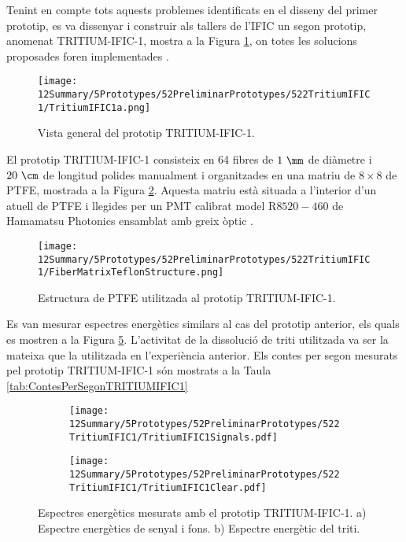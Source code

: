 Tenint en compte tots aquests problemes identificats en el disseny del primer prototip, es va dissenyar i construir als tallers de l'IFIC un segon prototip, anomenat TRITIUM-IFIC-1, mostra a la Figura \ref{fig:TritumIFIC1s}, on totes les solucions proposades foren implementades .

\begin{figure}[h]
\centering
\texttt{[image: 12Summary/5Prototypes/52PreliminarPrototypes/522TritiumIFIC1/TritiumIFIC1a.png]}
\caption{Vista general del prototip TRITIUM-IFIC-1.\label{fig:TritumIFIC1s}}
\end{figure}

El prototip TRITIUM-IFIC-1 consisteix en 64 fibres de $1~\mm$ de diàmetre i $20~\cm$ de longitud polides manualment i organitzades en una matriu de $8\times 8$ de PTFE, mostrada a la Figura \ref{fig:EstructuraPTFEFibresTritiumIFIC1}. Aquesta matriu està situada a l'interior d'un atuell de PTFE i llegides per un PMT calibrat model R$8520-460$ de Hamamatsu Photonics \cite{DataSheetPMTs} ensamblat amb greix òptic \cite{OpticalGrease}.

\begin{figure}[h]
\centering
\texttt{[image: 12Summary/5Prototypes/52PreliminarPrototypes/522TritiumIFIC1/FiberMatrixTeflonStructure.png]}
\caption{Estructura de PTFE utilitzada al prototip TRITIUM-IFIC-1.\label{fig:EstructuraPTFEFibresTritiumIFIC1}}
\end{figure}

Es van mesurar espectres energètics similars al cas del prototip anterior, els quals es mostren a la Figura \ref{fig:EspectresEnergeticsTRITIUMIFIC1}. L'activitat de la dissolució de triti utilitzada va ser la mateixa que la utilitzada en l'experiència anterior. Els contes per segon mesurats pel prototip TRITIUM-IFIC-1 són mostrats a la Taula \ref{tab:ContesPerSegonTRITIUMIFIC1}

\begin{figure}
\centering
    \begin{subfigure}[b]{1\textwidth}
    \centering
    \texttt{[image: 12Summary/5Prototypes/52PreliminarPrototypes/522TritiumIFIC1/TritiumIFIC1Signals.pdf]}  
    \caption{\label{subfig:EspectreEnergeticSenyalFonsTritiumIFIC1}}
    \end{subfigure}
    \hfill
    \begin{subfigure}[b]{1\textwidth}
    \centering
    \texttt{[image: 12Summary/5Prototypes/52PreliminarPrototypes/522TritiumIFIC1/TritiumIFIC1Clear.pdf]}  
    \caption{\label{subfig:EspectreEnergeticTritiTritiumIFIC1}}
    \end{subfigure}
 \caption{Espectres energètics mesurats amb el prototip TRITIUM-IFIC-1. a) Espectre energètics de senyal i fons. b) Espectre energètic del triti.}
 \label{fig:EspectresEnergeticsTRITIUMIFIC1}
\end{figure}

